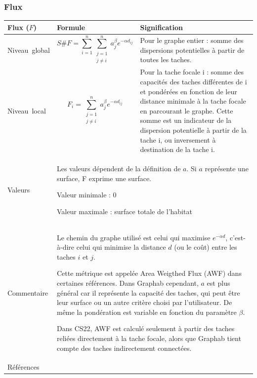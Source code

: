 \documentclass{article}
\begin{document}
\subsubsection{Flux}
\label{metric_F}
\begin{table}[H]
\begin{tabular}{|m{3.24cm}|m{4.4810004cm}m{7.924cm}|}

\hline
Flux ($F$) &
\multicolumn{1}{m{4.4810004cm}|}{Formule} &
Signification\\\hline
Niveau~global &
\multicolumn{1}{m{4.4810004cm}|}{\begin{equation*}
S\#F=\sum _{i=1}^{n}{\sum _{\begin{matrix}j=1\\j{\neq}i\end{matrix}}^{n}{{a}_{j}^{\beta }}}{e}^{-\alpha {d}_{\mathit{ij}}}
\end{equation*}
} &
Pour le graphe entier : somme des dispersions potentielles à partir de toutes les taches.\\\hline
Niveau~local &
\multicolumn{1}{m{4.4810004cm}|}{\begin{equation*}
{F}_{i}=\sum _{\begin{matrix}j=1\\j{\neq}i\end{matrix}}^{n}{{a}_{j}^{\beta }}{e}^{-\alpha {d}_{\mathit{ij}}}
\end{equation*}
} &
Pour la tache focale i : somme des capacités des taches différentes de i et pondérées en fonction de leur distance minimale à la tache focale en parcourant le graphe. Cette somme est un indicateur de la dispersion potentielle à partir de la tache i, ou inversement à destination de la tache i.

\\\hline
Valeurs &
\multicolumn{2}{m{12.6050005cm}|}{Les valeurs dépendent de la définition de $a$. Si $a$ représente une surface, F exprime une surface.

Valeur minimale : 0

Valeur maximale : surface totale de l’habitat
}\\\hline
Commentaire &
\multicolumn{2}{m{12.6050005cm}|}{Le chemin du graphe utilisé est celui qui maximise  ${e}^{-\mathit{\alpha d}}$, c’est-à-dire celui qui minimise la distance $d$ (ou le coût) entre les taches $i$ et $j$.

Cette métrique est appelée Area Weigthed Flux (AWF) dans certaines références. Dans Graphab cependant, $a$ est plus général car il représente la capacité des taches, qui peut être leur surface ou un autre critère choisi par l’utilisateur. De même la pondération est variable en fonction du paramètre $\beta$.

Dans CS22, AWF est calculé seulement à partir des taches reliées directement à la tache focale, alors que Graphab tient compte des taches indirectement connectées. 

}\\\hline
Références &
\multicolumn{2}{m{12.6050005cm}|}{
	\cite{Urban2001} \cite{Saura2009} \cite{2012_SDM}
}\\\hline
\end{tabular}
\end{table}
\end{document}
